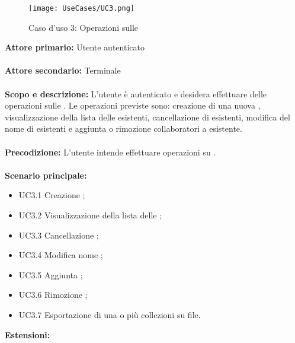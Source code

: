\documentclass{scalatekids-article}
\begin{document}
\begin{figure}[H]
  \begin{center}
    \texttt{[image: UseCases/UC3.png]}
    \caption*{Caso d'uso 3: Operazioni sulle }
  \end{center}
\end{figure}
\textbf{Attore primario:} Utente autenticato\\ \\
\textbf{Attore secondario:} Terminale\\ \\
\textbf{Scopo e descrizione:} L'utente è autenticato e desidera effettuare delle operazioni sulle . Le operazioni previste sono:
creazione di una nuova , visualizzazione della lista delle  esistenti, cancellazione di  esistenti, modifica del nome di  esistenti e
aggiunta o rimozione collaboratori a  esistente.\\ \\
\textbf{Precodizione:} L'utente intende effettuare operazioni su .\\ \\
\textbf{Scenario principale:}
\begin{itemize}
\item UC3.1 Creazione ;
\item UC3.2 Visualizzazione della lista delle ;
\item UC3.3 Cancellazione ;
\item UC3.4 Modifica nome ;
\item UC3.5 Aggiunta ;
\item UC3.6 Rimozione ;
\item UC3.7 Esportazione di una o più collezioni su file.
\end{itemize}
\textbf{Estensioni:}
\end{document}
